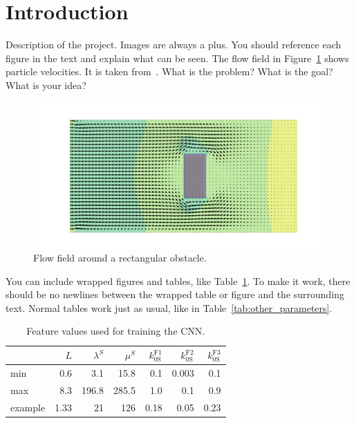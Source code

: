 \documentclass[11pt,table]{article}
\begin{document}
\newpage


\section{Introduction}

Description of the project. Images are always a plus. You should reference each figure in the text and explain what can be seen. The flow field in Figure~\ref{fig:flow} shows particle velocities. It is taken from~\cite{Author2020}. What is the problem? What is the goal? What is your idea?\\ 

\begin{figure}[h]
	\centering
	\includegraphics[scale=0.9]{Figures/example_cover.png}
	\caption{Flow field around a rectangular obstacle.}
	\label{fig:flow}
\end{figure}


You can include wrapped figures and tables, like Table~\ref{tab:features}. To make it work, there should be no newlines between the wrapped table or figure and the surrounding text. Normal tables work just as usual, like in Table~\ref{tab:other_parameters}.\\
\lipsum[1]

\begin{table}
	\begin{tabular}{@{} lrrrrrr @{}}
		\toprule
		 & $L$ & $\lambda^S$ & $\mu^S$ & $k_{0\text{S}}^{\text{F}1}$ & $k_{0\text{S}}^{\text{F}2}$ & $k_{0\text{S}}^{\text{F}3}$ \\
		\midrule
		min & 0.6 & 3.1 & 15.8 & 0.1 & 0.003 & 0.1 \\
		max & 8.3 & 196.8 & 285.5 & 1.0 & 0.1 & 0.9 \\
		example & 1.33 & 21 & 126 & 0.18 & 0.05 & 0.23 \\
		\bottomrule
	\end{tabular}
	\caption{Feature values used for training the CNN.}\label{tab:features}
\end{table} 
\end{document}
